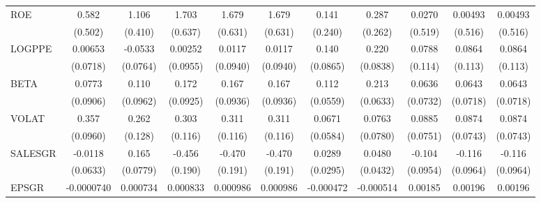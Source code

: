 \begin{table}[htbp]
\begin{tabular}{l*{10}{c}}
ROE             &    0.582         &    1.106\sym{***}&    1.703\sym{**} &    1.679\sym{**} &    1.679\sym{**} &    0.141         &    0.287         &   0.0270         &  0.00493         &  0.00493         \\
                &  (0.502)         &  (0.410)         &  (0.637)         &  (0.631)         &  (0.631)         &  (0.240)         &  (0.262)         &  (0.519)         &  (0.516)         &  (0.516)         \\
LOGPPE          &  0.00653         &  -0.0533         &  0.00252         &   0.0117         &   0.0117         &    0.140         &    0.220\sym{**} &   0.0788         &   0.0864         &   0.0864         \\
                & (0.0718)         & (0.0764)         & (0.0955)         & (0.0940)         & (0.0940)         & (0.0865)         & (0.0838)         &  (0.114)         &  (0.113)         &  (0.113)         \\
BETA            &   0.0773         &    0.110         &    0.172\sym{*}  &    0.167\sym{*}  &    0.167\sym{*}  &    0.112\sym{*}  &    0.213\sym{***}&   0.0636         &   0.0643         &   0.0643         \\
                & (0.0906)         & (0.0962)         & (0.0925)         & (0.0936)         & (0.0936)         & (0.0559)         & (0.0633)         & (0.0732)         & (0.0718)         & (0.0718)         \\
VOLAT           &    0.357\sym{***}&    0.262\sym{**} &    0.303\sym{**} &    0.311\sym{**} &    0.311\sym{**} &   0.0671         &   0.0763         &   0.0885         &   0.0874         &   0.0874         \\
                & (0.0960)         &  (0.128)         &  (0.116)         &  (0.116)         &  (0.116)         & (0.0584)         & (0.0780)         & (0.0751)         & (0.0743)         & (0.0743)         \\
SALESGR         &  -0.0118         &    0.165\sym{**} &   -0.456\sym{**} &   -0.470\sym{**} &   -0.470\sym{**} &   0.0289         &   0.0480         &   -0.104         &   -0.116         &   -0.116         \\
                & (0.0633)         & (0.0779)         &  (0.190)         &  (0.191)         &  (0.191)         & (0.0295)         & (0.0432)         & (0.0954)         & (0.0964)         & (0.0964)         \\
EPSGR           &-0.0000740         & 0.000734         & 0.000833         & 0.000986         & 0.000986         &-0.000472         &-0.000514         &  0.00185         &  0.00196\sym{*}  &  0.00196\sym{*}  \\

\end{tabular}
\end{table}
